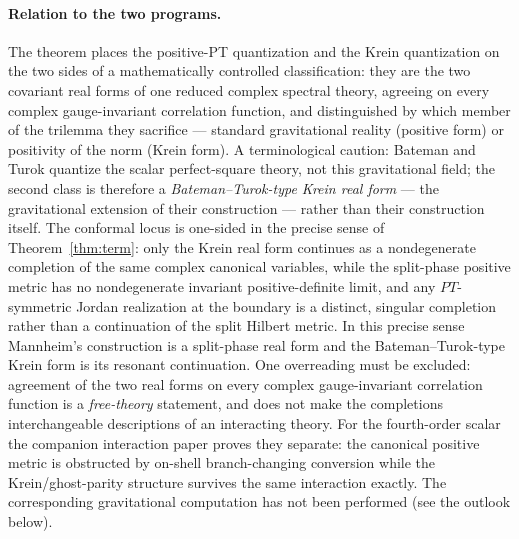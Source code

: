 \documentclass[11pt]{article}
\theoremstyle{definition}
\theoremstyle{remark}
\begin{document}
\paragraph{Relation to the two programs.}
The theorem places the positive-PT quantization \cite{BM2008PRD,
Mannheim2021} and the Krein quantization on the two sides of
a mathematically controlled classification: they are the two covariant
real forms of one reduced complex spectral theory, agreeing on every
complex gauge-invariant correlation function, and distinguished by which
member of the trilemma they sacrifice --- standard gravitational reality
(positive form) or positivity of the norm (Krein form).  A terminological
caution: Bateman and Turok \cite{BT2026} quantize the scalar
perfect-square theory, not this gravitational field; the second class is
therefore a \emph{Bateman--Turok-type Krein real form} --- the
gravitational extension of their construction --- rather than their
construction itself.  The conformal locus is one-sided in the precise
sense of Theorem~\ref{thm:term}: only the Krein real form continues as a
nondegenerate completion of the same complex canonical variables, while
the split-phase positive metric has no nondegenerate invariant
positive-definite limit, and any $PT$-symmetric Jordan realization at the
boundary \cite{BM2008Jordan} is a distinct, singular completion rather
than a continuation of the split Hilbert metric.  In this precise sense
Mannheim's construction is a split-phase real form and the
Bateman--Turok-type Krein form is its resonant continuation.  One
overreading must be excluded: agreement of the two real forms on every
complex gauge-invariant correlation function is a \emph{free-theory}
statement, and does not make the completions interchangeable
descriptions of an interacting theory.  For the fourth-order scalar the
companion interaction paper \cite{companionV} proves they separate:
the canonical positive metric is obstructed by on-shell branch-changing
conversion while the Krein/ghost-parity structure survives the same
interaction exactly.  The corresponding gravitational computation has
not been performed (see the outlook below).
\end{document}
